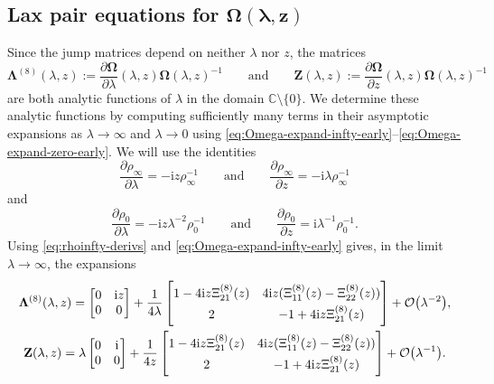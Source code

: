 \documentclass[pdftex]{sigma}
\numberwithin{equation}{section}
\newcommand{\ii}{\mathrm{i}}
\begin{document}
 \subsection[Lax pair equations for Omega (lambda,z)]{Lax pair equations for $\boldsymbol{\Omega(\lambda,z)}$}\label{sec:Lax-pair}

Since the jump matrices depend on neither $\lambda$ nor $z$, the matrices
\begin{equation}
 \mathbf{\Lambda}^{(8)}(\lambda,z):=\frac{\partial\mathbf{\Omega}}{\partial\lambda}(\lambda,z)\mathbf{\Omega}(\lambda,z)^{-1}\qquad\text{and}\qquad\mathbf{Z}(\lambda,z):=\frac{\partial\mathbf{\Omega}}{\partial z}(\lambda,z)\mathbf{\Omega}(\lambda,z)^{-1}
 \label{eq:Lambda-Z-def}
\end{equation}
are both analytic functions of $\lambda$ in the domain $\mathbb{C}\setminus\{0\}$.
We determine these analytic functions by computing sufficiently many terms in their asymptotic expansions as $\lambda\to\infty$ and $\lambda\to 0$ using \eqref{eq:Omega-expand-infty-early}--\eqref{eq:Omega-expand-zero-early}.
We will use the identities
\begin{equation}
 \frac{\partial\rho_\infty}{\partial\lambda} = -\ii z\rho_\infty^{-1}\qquad\text{and}\qquad\frac{\partial\rho_\infty}{\partial z} = -\ii\lambda\rho_\infty^{-1}
 \label{eq:rhoinfty-derivs}
\end{equation}
and
\begin{equation}
 \frac{\partial\rho_0}{\partial\lambda}=-\ii z\lambda^{-2}\rho_0^{-1}\qquad\text{and}\qquad\frac{\partial\rho_0}{\partial z} = \ii\lambda^{-1}\rho_0^{-1}.
 \label{eq:rhozero-derivs}
\end{equation}
Using \eqref{eq:rhoinfty-derivs} and \eqref{eq:Omega-expand-infty-early} gives, in the limit $\lambda\to\infty$, the expansions
\begin{gather}
 \mathbf{\Lambda}^{(8)}(\lambda,z)= \begin{bmatrix}0&{\ii z}{} \\0&0\end{bmatrix}
 +\frac{1}{4\lambda}\begin{bmatrix}1-{4\ii z}\Xi_{21}^{(8)}(z) & {4\ii z}{}(\Xi_{11}^{(8)}(z)-\Xi_{22}^{(8)}(z)) \vspace{1mm}\\ 2 &-1 +{4\ii z}\Xi_{21}^{(8)}(z)\end{bmatrix}+\mathcal{O}\big(\lambda^{-2}\big),\\
 \mathbf{Z}(\lambda,z)=
 \lambda\begin{bmatrix}0 & {\ii}{} \\0&0\end{bmatrix}
 +\frac{1}{4z}\begin{bmatrix}
 1-{4\ii z}\Xi_{21}^{(8)}(z) &{4\ii z}{}(\Xi_{11}^{(8)}(z)-\Xi_{22}^{(8)}(z)) \vspace{1mm}\\2 & -1+{4\ii z}\Xi_{21}^{(8)}(z)
 \end{bmatrix}
 +\mathcal{O}\big(\lambda^{-1}\big).
\label{eq:Lax-coefficients-infty}
\end{gather}
\end{document}
